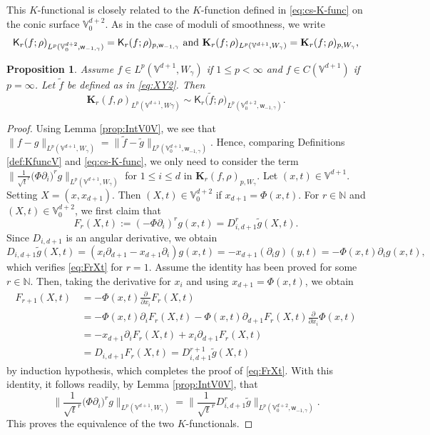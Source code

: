 \documentclass{amsart}
\newtheorem{prop}[thm]{Proposition}
\theoremstyle{remark}
\def\g{{\gamma}}
\def\Kb{{\mathbf K}}
\def\NN{{\mathbb N}}
\def\VV{{\mathbb V}}
\def\sK{{\mathsf K}}
\def\sw{{\mathsf w}}
\def\g{{\gamma}}
\def\Kb{{\mathbf K}}
\def\NN{{\mathbb N}}
\def\VV{{\mathbb V}}
\newcommand{\wt}{\widetilde}
\begin{document}
This $K$-functional is closely related to the $K$-function defined in \eqref{eq:cs-K-func} on the conic surface 
$\VV_0^{d+2}$. As in the case of moduli of smoothness, we write
$$
\sK_r(f; \rho)_{L^p(\VV_0^{d+2},  \sw_{-1,\g})} = \sK_r(f; \rho)_{p,\sw_{-1,\g}}   \, \, \hbox{and} \, \, 
  \Kb_r(f; \rho)_{L^p(\VV^{d+1}, W_\g)} =\Kb_r(f; \rho)_{p,W_\g},
$$

\begin{prop}\label{prop:K-equ}
Assume $f \in L^p(\VV^{d+1}, W_\g)$ if $1\le p < \infty$ and $f \in C(\VV^{d+1})$ if $p = \infty$. Let $\wt f$ be defined
as in \eqref{eq:XY2}. Then 
$$
 \Kb_r(f, \rho)_{L^p(\VV^{d+1}, W\g)} \sim  \sK_r \big(\wt f; \rho\big)_{L^p(\VV_0^{d+2}, \sw_{-1,\g})}.
$$
\end{prop}

\begin{proof}
Using Lemma \ref{prop:IntV0V}, we see that $\|f-g\|_{L^p(\VV^{d+1},W_\g)} = \|\wt f - \wt g\|_{L^p(\VV_0^{d+1}, \sw_{-1,\g})}$.  
Hence, comparing Definitions \ref{def:KfuncV} and \ref{eq:cs-K-func}, we only need to consider the term 
$\Big \|\frac 1{\sqrt{t}^r} \big ( \Phi \partial_i \big)^r g \Big \|_{L^p(\VV^{d+1},W_\g)}$ for $1 \le i \le d$ 
in $\Kb_r(f,\rho)_{p,W_{\g}}$. Let $(x,t) \in \VV^{d+1}$. Setting $X=(x,x_{d+1})$. Then $(X,t) \in \VV_0^{d+2}$ 
if $x_{d+1} = \Phi(x,t)$. For $r \in \NN$ and $(X,t) \in \VV_0^{d+2}$, we first claim that 
\begin{equation} \label{eq:FrXt}
F_r(X,t):=  (- \Phi \partial_i)^r g (x, t) = D_{i, d+1}^r \wt g(X ,t). 
\end{equation}
Since $D_{i,d+1}$ is an angular derivative, we obtain 
$$
   D_{i, d+1} \wt g(X,t) = (x_i \partial_{d+1} - x_{d+1} \partial_i) g(x,t) =   - x_{d+1} (\partial_i g)(y,t) = - \Phi(x,t) \partial_i g(x,t),
$$
which verifies \eqref{eq:FrXt} for $r =1$. Assume the identity has been proved for some $r\in \NN$. Then, taking the
derivative for $x_i$ and using $x_{d+1} = \Phi(x,t)$, we obtain 
\begin{align*}
 F_{r+1}(X,t)\,& =  - \Phi(x,t) \frac{\partial}{\partial x_i} F_r(X,t) \\
      & = - \Phi(x,t) \partial_i F_r(X,t) - \Phi(x,t) \partial_{d+1} F_r(X,t) \frac{\partial}{\partial x_i} \Phi(x,t) \\
      & = - x_{d+1} \partial_i F_r(X,t) + x_i \partial_{d+1} F_r(X,t) \\
      &  = D_{i, d+1} F_r(X,t) = D_{i, d+1}^{r+1} \wt g(X,t)
\end{align*}
by induction hypothesis, which completes the proof of \eqref{eq:FrXt}. With this identity, it follows readily, by 
Lemma \ref{prop:IntV0V}, that 
$$
  \Big \|\frac 1{\sqrt{t}^r} \big ( \Phi \partial_i \big)^r g \Big \|_{L^p(\VV^{d+1},W_\g)}
        =  \Big \|\frac 1{\sqrt{t}^r} D_{i,d+1}^r \tilde{g}\Big \|_{L^p(\VV_0^{d+2},\sw_{-1,\g})}.
$$
This proves the equivalence of the two $K$-functionals. 
\end{proof}
\end{document}
